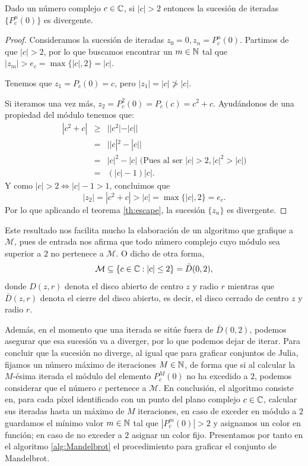 \begin{proposicion}
  \label{prop:mandelbrot-escape}
  Dado un número complejo $c\in\mathbb{C}$, si $|c|>2$ entonces la sucesión de iteradas $\{P_c^n(0)\}$ es divergente.
\end{proposicion}
\begin{proof}
  Consideramos la sucesión de iteradas $z_0 = 0, z_n=P_c^n(0)$. Partimos de que $|c|>2$, por lo que buscamos encontrar un $m\in\mathbb{N}$ tal que $|z_m|>e_c=\max\{|c|,2\}=|c|$.
  
  Tenemos que $z_1=P_c(0)=c$, pero $|z_1|=|c|\not>|c|$.
  
  Si iteramos una vez más, $z_2=P_c^2(0)=P_c(c)=c^2+c$. Ayudándonos de una propiedad del módulo tenemos que:
  \begin{eqnarray*}
    |c^2+c| & \geq & ||c^2|-|c|| \\
            & = & ||c|^2 -|c|| \\
            & = & |c|^2-|c| \text{ (Pues al ser } |c|>2, |c|^2>|c|) \\
            & = & (|c|-1)|c|.
  \end{eqnarray*}
  Y como $|c|>2\Leftrightarrow |c|-1>1$, concluimos que
  $$
  |z_2|=|c^2+c| > |c| = \max\{|c|,2\} = e_c.
  $$
  Por lo que aplicando el teorema \ref{th:escape}, la sucesión $\{z_n\}$ es divergente.
\end{proof}

Este resultado nos facilita mucho la elaboración de un algoritmo que grafique a $\mathcal{M}$, pues de entrada nos afirma que todo número complejo cuyo módulo sea superior a $2$ no pertenece a $\mathcal M$. O dicho de otra forma, 
$$
\mathcal{M}\subseteq \{c\in\mathbb{C}: |c|\leq 2\} = \bar D(0,2),
$$
donde $D(z,r)$ denota el disco abierto de centro $z$ y radio $r$ mientras que $\bar D(z,r)$ denota el cierre del disco abierto, es decir, el disco cerrado de centro $z$ y radio $r$.

Además, en el momento que una iterada se sitúe fuera de $\bar D(0,2)$, podemos asegurar que esa sucesión va a diverger, por lo que podemos dejar de iterar. Para concluir que la sucesión no diverge, al igual que para graficar conjuntos de Julia, fijamos un número máximo de iteraciones $M\in\mathbb{N}$, de forma que si al calcular la $M$-ésima iterada el módulo del elemento $P_c^{M}(0)$ no ha excedido a $2$, podemos considerar que el número $c$ pertenece a $\mathcal{M}$. En conclusión, el algoritmo consiste en, para cada píxel identificado con un punto del plano complejo $c\in\mathbb{C}$, calcular sus iteradas hasta un máximo de $M$ iteraciones, en caso de exceder en módulo a $2$ guardamos el mínimo valor $m\in\mathbb{N}$ tal que $|P_c^m(0)|>2$ y asignamos un color en función; en caso de no exceder a $2$ asignar un color fijo. Presentamos por tanto en el algoritmo \ref{alg:Mandelbrot} el procedimiento para graficar el conjunto de Mandelbrot. 

